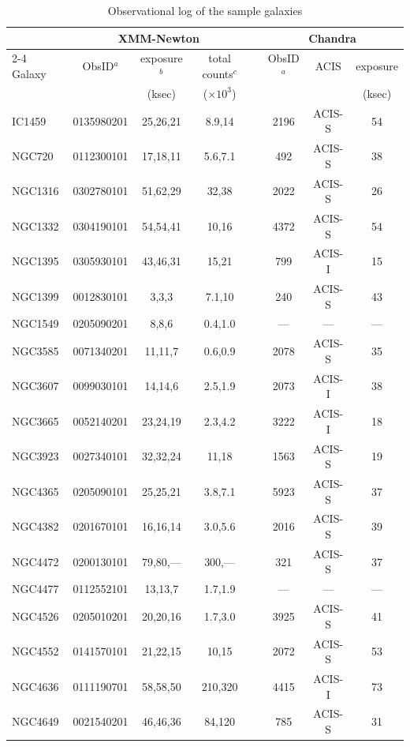 \documentclass[structabstract]{aa}
\begin{document}
\begin{table}
\caption{Observational log of the sample galaxies}
\label{tab:obs_data}
\centering
\begin{tabular}{lccccccc}
\hline \hline
 & \multicolumn{3}{c}{XMM-Newton} & & \multicolumn{3}{c}{Chandra} \\ %
\cline{2-4} \cline{6-8}
Galaxy & ObsID$^a$ & exposure$^b$ & total counts$^c$ & & ObsID$^a$ & ACIS & exposure \\
 & & (ksec) & ($\times10^3$) & & & & (ksec) \\ \hline
IC1459  & 0135980201 & 25,26,21  & 8.9,14  & & 2196 & ACIS-S & 54  \\
NGC720  & 0112300101 & 17,18,11  & 5.6,7.1 & & 492  & ACIS-S & 38  \\
NGC1316 & 0302780101 & 51,62,29  & 32,38   & & 2022 & ACIS-S & 26  \\
NGC1332 & 0304190101 & 54,54,41  & 10,16   & & 4372 & ACIS-S & 54  \\
NGC1395 & 0305930101 & 43,46,31  & 15,21   & & 799  & ACIS-I & 15  \\
NGC1399 & 0012830101 & 3,3,3     & 7.1,10  & & 240  & ACIS-S & 43  \\
NGC1549 & 0205090201 & 8,8,6     & 0.4,1.0 & & ---  & ---    & --- \\
NGC3585 & 0071340201 & 11,11,7   & 0.6,0.9 & & 2078 & ACIS-S & 35  \\
NGC3607 & 0099030101 & 14,14,6   & 2.5,1.9 & & 2073 & ACIS-I & 38  \\
NGC3665 & 0052140201 & 23,24,19  & 2.3,4.2 & & 3222 & ACIS-I & 18  \\
NGC3923 & 0027340101 & 32,32,24  & 11,18   & & 1563 & ACIS-S & 19  \\
NGC4365 & 0205090101 & 25,25,21  & 3.8,7.1 & & 5923 & ACIS-S & 37  \\
NGC4382 & 0201670101 & 16,16,14  & 3.0,5.6 & & 2016 & ACIS-S & 39  \\
NGC4472 & 0200130101 & 79,80,--- & 300,--- & & 321  & ACIS-S & 37  \\
NGC4477 & 0112552101 & 13,13,7   & 1.7,1.9 & & ---  & ---    & --- \\
NGC4526 & 0205010201 & 20,20,16  & 1.7,3.0 & & 3925 & ACIS-S & 41  \\
NGC4552 & 0141570101 & 21,22,15  & 10,15   & & 2072 & ACIS-S & 53  \\
NGC4636 & 0111190701 & 58,58,50  & 210,320 & & 4415 & ACIS-I & 73  \\
NGC4649 & 0021540201 & 46,46,36  & 84,120  & & 785  & ACIS-S & 31  \\

\end{tabular}
\end{table}
\end{document}
